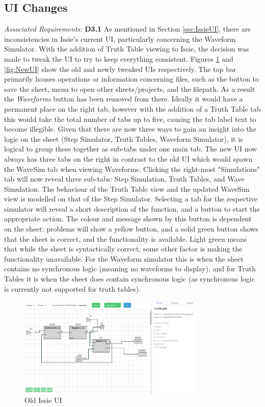 \subsection{UI Changes}
\emph{Associated Requirements:} \textbf{D3.1}
As mentioned in Section \ref{sec:IssieUI}, there are inconsistencies in Issie's current UI, particularly concerning the Waveform Simulator. With the addition of Truth Table viewing to Issie, the decision was made to tweak the UI to try to keep everything consistent. Figures \ref{fig:OldUI} and \ref{fig:NewUI} show the old and newly tweaked UIs respectively. The top bar primarily houses operations or information concerning files, such as the button to save the sheet, menu to open other sheets/projects, and the filepath. As a result the \textit{Waveforms} button has been removed from there. Ideally it would have a permanent place on the right tab, however with the addition of a Truth Table tab this would take the total number of tabs up to five, causing the tab label text to become illegible.  Given that there are now three ways to gain an insight into the logic on the sheet (Step Simulator, Truth Tables, Waveform Simulator), it is logical to group these together as sub-tabs under one main tab. The new UI now always has three tabs on the right in contrast to the old UI which would spawn the WaveSim tab when viewing Waveforms. Clicking the right-most "Simulations" tab will now reveal three sub-tabs: Step Simulation, Truth Tables, and Wave Simulation. The behaviour of the Truth Table view and the updated WaveSim view is modelled on that of the Step Simulator. Selecting a tab for the respective simulator will reveal a short description of the function, and a button to start the appropriate action. The colour and message shown by this button is dependent on the sheet: problems will show a yellow button, and a solid green button shows that the sheet is correct, and the functionality is available. Light green means that while the sheet is syntactically correct, some other factor is making the functionality unavailable. For the Waveform simulator this is when the sheet contains no synchronous logic (meaning no waveforms to display), and for Truth Tables it is when the sheet does contain synchronous logic (as synchronous logic is currently not supported for truth tables).

\begin{figure}
    \centering
    \includegraphics[width=0.8\textwidth]{04.ImpPlan/OldUI.png}
    \caption{Old Issie UI}
    \label{fig:OldUI}
\end{figure}

